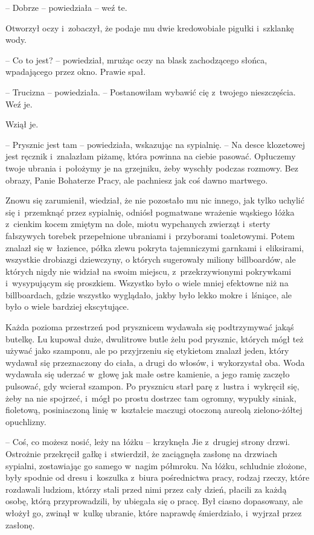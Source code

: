 \documentclass[oneside,polish,11pt,rmheadings]{mwbk}
\begin{document}
-- Dobrze -- powiedziała -- weź te. 

 Otworzył oczy i~zobaczył, że podaje mu dwie kredowobiałe pigułki i~szklankę wody.

-- Co to jest? -- powiedział, mrużąc oczy na blask zachodzącego słońca, wpadającego przez okno. Prawie spał.

-- Trucizna -- powiedziała. -- Postanowiłam wybawić cię z~twojego nieszczęścia. Weź je.

Wziął je.

-- Prysznic jest tam -- powiedziała, wskazując na sypialnię. -- Na desce klozetowej jest ręcznik i~znalazłam piżamę, która powinna na ciebie pasować. Opłuczemy twoje ubrania i~położymy je na grzejniku, żeby wyschły podczas rozmowy. Bez obrazy, Panie Bohaterze Pracy, ale pachniesz jak coś dawno martwego. 

Znowu się zarumienił, wiedział, że nie pozostało mu nic innego, jak tylko uchylić się i~przemknąć przez sypialnię, odniósł pogmatwane wrażenie wąskiego łóżka z~cienkim kocem zmiętym na dole, miotu wypchanych zwierząt i~sterty fałszywych torebek przepełnione ubraniami i~przyborami toaletowymi. Potem znalazł się w~łazience, półka zlewu pokryta tajemniczymi garnkami i~eliksirami, wszystkie drobiazgi dziewczyny, o których sugerowały miliony billboardów, ale których nigdy nie widział na swoim miejscu, z~przekrzywionymi pokrywkami i~wysypującym się proszkiem. Wszystko było o wiele mniej efektowne niż na billboardach, gdzie wszystko wyglądało, jakby było lekko mokre i~lśniące, ale było o wiele bardziej ekscytujące.

Każda pozioma przestrzeń pod prysznicem wydawała się podtrzymywać jakąś butelkę. Lu kupował duże, dwulitrowe butle żelu pod prysznic, których mógł też używać jako szamponu, ale po przyjrzeniu się etykietom znalazł jeden, który wydawał się przeznaczony do ciała, a drugi do włosów, i~wykorzystał oba. Woda wydawała się uderzać w~głowę jak małe ostre kamienie, a jego ramię zaczęło pulsować, gdy wcierał szampon. Po prysznicu starł parę z~lustra i~wykręcił się, żeby na nie spojrzeć, i~mógł po prostu dostrzec tam ogromny, wypukły siniak, fioletową, posiniaczoną linię w~kształcie maczugi otoczoną aureolą zielono-żółtej opuchlizny.

-- Coś, co możesz nosić, leży na łóżku -- krzyknęła Jie z~drugiej strony drzwi. Ostrożnie przekręcił gałkę i~stwierdził, że zaciągnęła zasłonę na drzwiach sypialni, zostawiając go samego w~nagim półmroku. Na łóżku, schludnie złożone, były spodnie od dresu i~koszulka z~biura pośrednictwa pracy, rodzaj rzeczy, które rozdawali ludziom, którzy stali przed nimi przez cały dzień, płacili za każdą osobę, którą przyprowadzili, by ubiegała się o pracę. Był ciasno dopasowany, ale włożył go, zwinął w~kulkę ubranie, które naprawdę śmierdziało, i~wyjrzał przez zasłonę.
\end{document}
